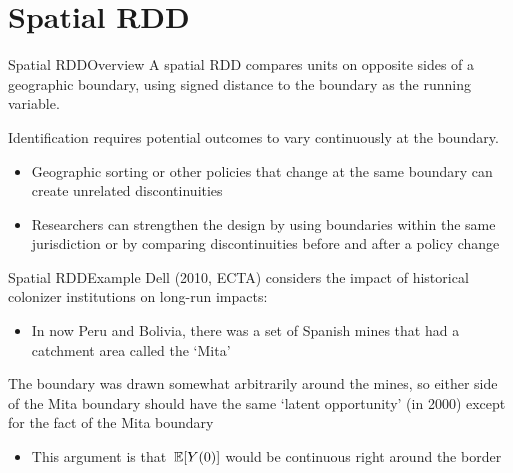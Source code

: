 \documentclass[aspectratio=169,t,11pt,table]{beamer}
\begin{document}


\section{Spatial RDD}

\begin{frame}{Spatial RDD}{Overview}
  A spatial RDD compares units on opposite sides of a geographic boundary, using signed distance to the boundary as the running variable.

  \bigskip
  Identification requires potential outcomes to vary continuously at the boundary.
  \begin{itemize}
    \item Geographic sorting or other policies that change at the same boundary can create unrelated discontinuities
    \item Researchers can strengthen the design by using boundaries within the same jurisdiction or by comparing discontinuities before and after a policy change
  \end{itemize}
\end{frame}

\begin{frame}{Spatial RDD}{Example}
  Dell (2010, ECTA) considers the impact of historical colonizer institutions on long-run impacts:
  \begin{itemize}
    \item In now Peru and Bolivia, there was a set of Spanish mines that had a catchment area called the `Mita'
  \end{itemize}

  \bigskip
  The boundary was drawn somewhat arbitrarily around the mines, so either side of the Mita boundary should have the same `latent opportunity' (in 2000) except for the fact of the Mita boundary 
  \begin{itemize}
    \item This argument is that $\expec{Y(0)}$ would be continuous right around the border 
  \end{itemize}
\end{frame}

\end{document}
